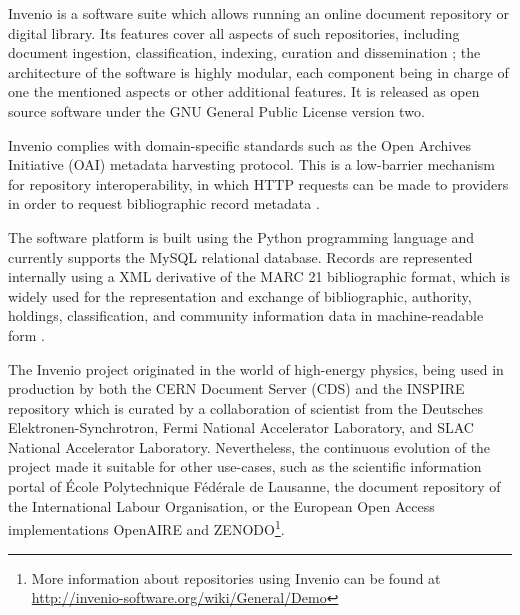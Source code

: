 
Invenio is a software suite which allows running an online document repository
or digital library. Its features cover all aspects of such repositories,
including document ingestion, classification, indexing, curation and
dissemination \cite{ref:invenio}; the architecture of the software is highly
modular, each component being in charge of one the mentioned aspects or other
additional features. It is released as open source software under the GNU
General Public License version two.

Invenio complies with domain-specific standards such as the Open Archives
Initiative (OAI) metadata harvesting protocol. This is a low-barrier mechanism for
repository interoperability, in which HTTP requests can be made to providers in
order to request bibliographic record metadata \cite{ref:oai}.

The software platform is built using the Python programming language and
currently supports the MySQL relational database. Records are represented
internally using a XML derivative of the MARC 21 bibliographic format, which is
widely used for the representation and exchange of bibliographic, authority,
holdings, classification, and community information data in machine-readable
form \cite{ref:marc}.

The Invenio project originated in the world of high-energy physics, being used
in production by both the CERN Document Server (CDS) and the INSPIRE repository
which is curated by a collaboration of scientist from the Deutsches
Elektronen-Synchrotron, Fermi National Accelerator Laboratory, and SLAC
National Accelerator Laboratory. Nevertheless, the continuous evolution of the
project made it suitable for other use-cases, such as the scientific
information portal of \'{E}cole Polytechnique F\'{e}d\'{e}rale de Lausanne, the
document repository of the International Labour Organisation, or the European
Open Access implementations OpenAIRE and ZENODO\footnote{More information about
repositories using Invenio can be found at
\url{http://invenio-software.org/wiki/General/Demo}}.
